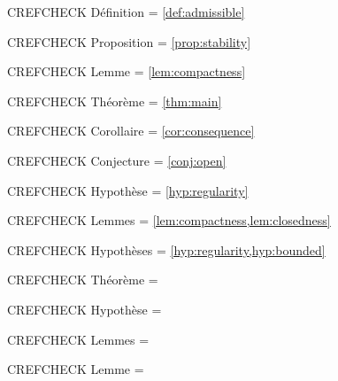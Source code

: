 \documentclass[11pt]{ocots-paper}
\begin{document}
\noindent CREFCHECK Définition = \cref{def:admissible}\par
\noindent CREFCHECK Proposition = \cref{prop:stability}\par
\noindent CREFCHECK Lemme = \cref{lem:compactness}\par
\noindent CREFCHECK Théorème = \cref{thm:main}\par
\noindent CREFCHECK Corollaire = \cref{cor:consequence}\par
\noindent CREFCHECK Conjecture = \cref{conj:open}\par
\noindent CREFCHECK Hypothèse = \cref{hyp:regularity}\par
\noindent CREFCHECK Lemmes = \cref{lem:compactness,lem:closedness}\par
\noindent CREFCHECK Hypothèses = \cref{hyp:regularity,hyp:bounded}\par

\noindent CREFCHECK Théorème = \par
\noindent CREFCHECK Hypothèse = \par
\noindent CREFCHECK Lemmes = \par
\noindent CREFCHECK Lemme = \par
\end{document}

